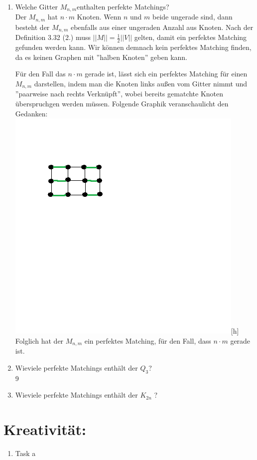 \begin{enumerate}[label=(\alph*)]
        \item 
        Welche Gitter $M_{n,m} $enthalten perfekte Matchings? \\
        Der $M_{n,m}$ hat $n \cdot m$ Knoten. Wenn $n$ und $m$ beide ungerade sind, dann besteht der $M_{n,m}$ ebenfalls aus einer ungeraden Anzahl aus Knoten. Nach der Definition 3.32 (2.) muss $||M|| = \frac{1}{2} ||V||$ gelten, damit ein perfektes Matching gefunden werden kann. Wir können demnach kein perfektes Matching finden, da es keinen Graphen mit ''halben Knoten'' geben kann. \par
        Für den Fall das $n \cdot m$ gerade ist, lässt sich ein perfektes Matching für einen $M_{n,m}$ darstellen, indem man die Knoten links außen vom Gitter nimmt und ''paarweise nach rechts Verknüpft'', wobei bereits gematchte Knoten überspruchgen werden müssen. Folgende Graphik veranschaulicht den Gedanken:
        \includegraphics{task_h}[h]
        Folglich hat der $M_{n,m}$ ein perfektes Matching, für den Fall, dass $n \cdot m$ gerade ist.
        
        \item
        Wieviele perfekte Matchings enthält der $Q_3$? \\
        9
        \item 
        Wieviele perfekte Matchings enthält der $K_{2n}$ ?
        
    \end{enumerate}
    \section*{Kreativität:}
    \begin{enumerate}[label=(\alph*)]
    	\item Task a
    \end{enumerate}
